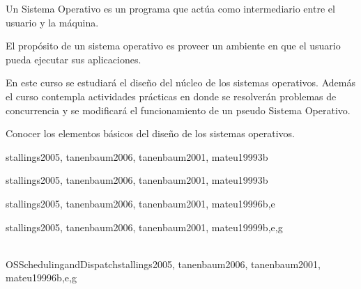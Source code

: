 \begin{syllabus}


\begin{justification}
    Un Sistema Operativo es un programa que actúa como intermediario entre el usuario y la máquina.
    
    El propósito de un sistema operativo es proveer un ambiente en que el usuario pueda ejecutar sus aplicaciones.
    
    En este curso se estudiará el diseño del núcleo de los sistemas operativos.
    Además el curso contempla actividades prácticas en donde se resolverán problemas de 
    concurrencia y se modificará el funcionamiento de un pseudo Sistema Operativo.
\end{justification}

\begin{goals}
\item Conocer los elementos básicos del diseño de los sistemas operativos.
\end{goals}



\begin{unit}{\ALAlgorithmicStrategies}{}{stallings2005, tanenbaum2006, tanenbaum2001, mateu1999}{3}{b}
    \ALAlgorithmicStrategiesAllTopics
    \ALAlgorithmicStrategiesAllLearningOutcomes
\end{unit}

\begin{unit}{\OSOverviewofOperatingSystems}{}{stallings2005, tanenbaum2006, tanenbaum2001, mateu1999}{3}{b}
    \OSOverviewofOperatingSystemsAllTopics
    \OSOverviewofOperatingSystemsAllLearningOutcomes
\end{unit}

\begin{unit}{\OSOperatingSystemPrinciples}{}{stallings2005, tanenbaum2006, tanenbaum2001, mateu1999}{6}{b,e}
    \OSOperatingSystemPrinciplesAllTopics
    \OSOperatingSystemPrinciplesAllLearningOutcomes
\end{unit}

\begin{unit}{\OSConcurrency}{}{stallings2005, tanenbaum2006, tanenbaum2001, mateu1999}{9}{b,e,g}
    \OSConcurrencyAllTopics
    \OSConcurrencyAllLearningOutcomes
\end{unit}

\begin{unit}{\\OSSchedulingandDispatch}{}{stallings2005, tanenbaum2006, tanenbaum2001, mateu1999}{6}{b,e,g}
    \OSSchedulingandDispatchAllTopics
    \OSSchedulingandDispatchAllLearningOutcomes
\end{unit}


\end{syllabus}
